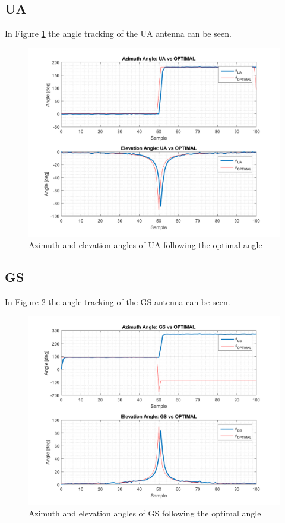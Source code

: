 \subsection{UA}
In Figure \ref{fig:s3_ua} the angle tracking of the UA antenna can be seen.

\begin{figure}[H]
	\centering
	\includegraphics[scale=0.75]{figures/s3_ua.png}
	\caption{Azimuth and elevation angles of UA following the optimal angle}
	\label{fig:s3_ua}
\end{figure}

\subsection{GS}
In Figure \ref{fig:s3_gs} the angle tracking of the GS antenna can be seen.

\begin{figure}[H]
	\centering
	\includegraphics[scale=0.75]{figures/s3_gs.png}
	\caption{Azimuth and elevation angles of GS following the optimal angle}
	\label{fig:s3_gs}
\end{figure}

